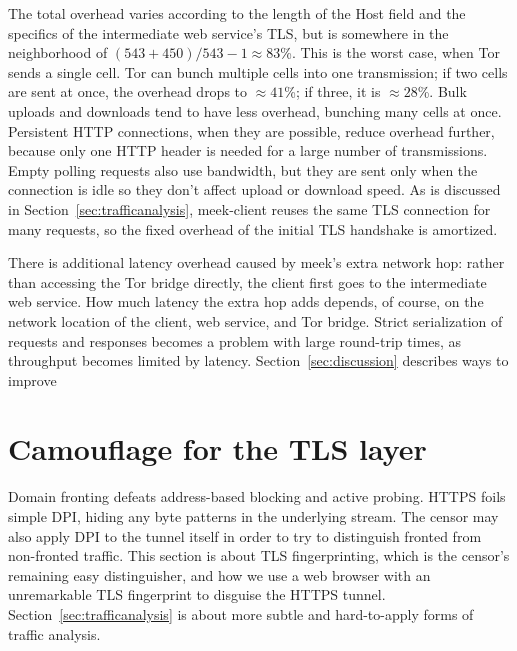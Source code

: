 \documentclass[conference]{IEEEtran}
\newcommand{\meekclient}{\mbox{meek-client}\xspace}
\begin{document}
\noindent
The total overhead varies according to the length
of the Host field and the specifics of the intermediate web service's TLS,
but is somewhere in the neighborhood of $(543+450)/543-1\approx83$\%.
This is the worst case, when Tor sends a single cell.
Tor can bunch multiple cells into one transmission;
if two cells are sent at once, the overhead drops to
${\approx}41$\%; if three, it is ${\approx}28$\%.
Bulk uploads and downloads tend to have less overhead, bunching many cells at once.
Persistent HTTP connections, when they are possible, reduce overhead further,
because only one HTTP header is needed for a large number of transmissions.
Empty polling requests also use bandwidth,
but they are sent only when the connection is idle
so they don't affect upload or download speed.
As is discussed in Section~\ref{sec:trafficanalysis},
\meekclient reuses the same TLS connection for many requests,
so the fixed overhead of the initial TLS handshake is amortized.


There is additional latency overhead caused by meek's extra network hop:
rather than accessing the Tor bridge directly,
the client first goes to the intermediate web service.
How much latency the extra hop adds depends, of course, on the network location
of the client, web service, and Tor bridge.
Strict serialization of requests and responses
becomes a problem with large round-trip times,
as throughput becomes limited by latency.
Section~\ref{sec:discussion} describes ways to improve

\section{Camouflage for the TLS layer}
\label{sec:browserextension}

Domain fronting defeats address-based blocking and active probing.
HTTPS foils simple DPI,
hiding any byte patterns in the underlying stream.
The censor may also apply DPI to the tunnel itself in order to try to
distinguish fronted from non-fronted traffic.
This section is about TLS fingerprinting,
which is the censor's remaining easy distinguisher,
and how we use a web browser with an unremarkable TLS fingerprint
to disguise the HTTPS tunnel.
Section~\ref{sec:trafficanalysis} is about more subtle and hard-to-apply forms of traffic analysis.
\end{document}
